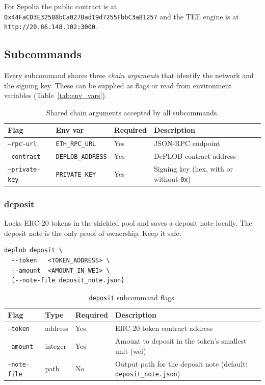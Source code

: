 \documentclass[12pt,a4paper]{article}
\begin{document}
\noindent For Sepolia the public contract is at \texttt{0x44FaCD3E32588bCa027Bad19d7255FbbC3a81257} and the TEE engine is at \texttt{http://20.86.148.102:3000}.

\subsection{Subcommands}

Every subcommand shares three \textit{chain arguments} that identify the network and the signing key.  These can be supplied as flags or read from environment variables (Table~\ref{tab:env_vars}).

\begin{table}[H]
\centering
\small
\begin{tabular}{|l|l|l|p{5cm}|}
\hline
\textbf{Flag} & \textbf{Env var} & \textbf{Required} & \textbf{Description} \\
\hline
\texttt{--rpc-url} & \texttt{ETH\_RPC\_URL} & Yes & JSON-RPC endpoint \\
\hline
\texttt{--contract} & \texttt{DEPLOB\_ADDRESS} & Yes & DePLOB contract address \\
\hline
\texttt{--private-key} & \texttt{PRIVATE\_KEY} & Yes & Signing key (hex, with or without \texttt{0x}) \\
\hline
\end{tabular}
\caption{Shared chain arguments accepted by all subcommands.}
\label{tab:chain_args}
\end{table}

\subsubsection{deposit}

Locks ERC-20 tokens in the shielded pool and saves a deposit note locally.  The deposit note is the only proof of ownership. Keep it safe.

\begin{verbatim}
deplob deposit \
  --token   <TOKEN_ADDRESS> \
  --amount  <AMOUNT_IN_WEI> \
  [--note-file deposit_note.json]
\end{verbatim}

\begin{table}[H]
\centering
\small
\begin{tabular}{|l|l|l|p{5.5cm}|}
\hline
\textbf{Flag} & \textbf{Type} & \textbf{Required} & \textbf{Description} \\
\hline
\texttt{--token} & address & Yes & ERC-20 token contract address \\
\hline
\texttt{--amount} & integer & Yes & Amount to deposit in the token's smallest unit (wei) \\
\hline
\texttt{--note-file} & path & No & Output path for the deposit note (default: \texttt{deposit\_note.json}) \\
\hline
\end{tabular}
\caption{\texttt{deposit} subcommand flags.}
\end{table}
\end{document}
